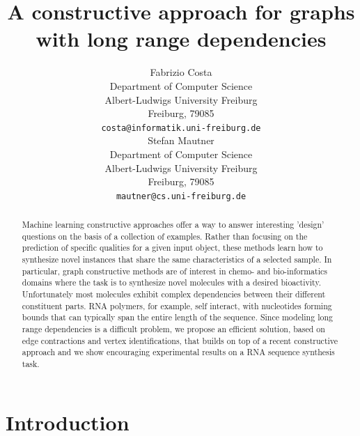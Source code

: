 \documentclass{article}
\title{A constructive approach for graphs\\with long range dependencies}
\author{
  Fabrizio Costa \\
  Department of Computer Science\\
  Albert-Ludwigs University Freiburg\\
  Freiburg, 79085  \\
  \texttt{costa@informatik.uni-freiburg.de} \\
  \And
  Stefan Mautner\\
  Department of Computer Science\\
  Albert-Ludwigs University Freiburg\\
  Freiburg, 79085  \\
  \texttt{mautner@cs.uni-freiburg.de} \\
}
\begin{document}

\maketitle

\begin{abstract}

Machine learning constructive approaches offer a way to answer interesting
'design' questions on the basis of a collection of examples. Rather than
focusing on the prediction of specific qualities for a given input object,
these methods learn how to synthesize novel instances that share the same
characteristics of a selected sample. In particular, graph constructive
methods are of interest in chemo- and bio-informatics domains where the task
is to synthesize novel molecules with a desired bioactivity. Unfortunately
most molecules exhibit complex dependencies between their different
constituent parts. RNA polymers, for example, self interact, with nucleotides
forming bounds that can typically span the entire length of the sequence.
Since modeling long range dependencies is a difficult problem, we propose an
efficient solution, based on edge contractions and vertex identifications,
that builds on top of a recent constructive approach and we show encouraging
experimental results on a RNA sequence synthesis task.






\end{abstract}
\section{Introduction}
\end{document}
